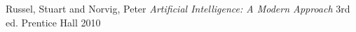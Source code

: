 \begin{thebibliography}{1}
   Russel, Stuart and Norvig, Peter \emph{Artificial Intelligence:
    A Modern Approach} 3rd ed. Prentice Hall 2010
\end{thebibliography}
